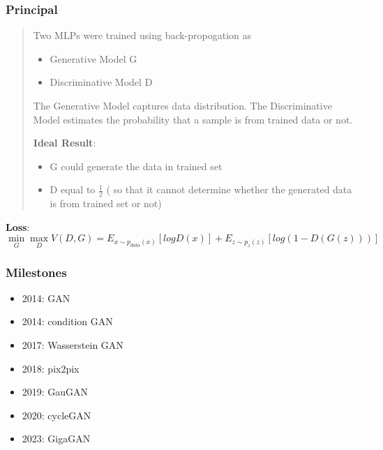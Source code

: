 \begin{frame}
    \frametitle{Principal}
    \begin{quote}
        Two MLPs were trained using back-propogation as
        \begin{itemize}
            \item Generative Model G
            \item Discriminative Model D
        \end{itemize}

        The Generative Model captures data distribution.
        The Discriminative Model estimates the probability that a sample is from trained data or not.

        \textbf{Ideal Result}:
        \begin{itemize}
            \item G could generate the data in trained set
            \item D equal to $\frac{1}{2}$ ( so that it cannot determine whether the generated data is from trained set or not)
        \end{itemize}
    \end{quote}
    \textbf{Loss}:
    $$\min_G\max_DV(D,G) = E_{x\sim p_{data}(x)}[logD(x)] + E_{z\sim p_{z}(z)}[log(1 - D(G(z)))]$$
\end{frame}

\begin{frame}
    \frametitle{Milestones}
    \begin{itemize}
        \item 2014: GAN\cite{goodfellowGenerativeAdversarialNetworks2014}
        \item 2014: condition GAN \cite{mirzaConditionalGenerativeAdversarial2014}
        \item 2017: Wasserstein GAN \cite{arjovskyWassersteinGAN2017}
        \item 2018: pix2pix \cite{isolaImagetoImageTranslationConditional2018}
        \item 2019: GauGAN \cite{parkSemanticImageSynthesis2019}
        \item 2020: cycleGAN \cite{zhuUnpairedImagetoImageTranslation2020}
        \item 2023: GigaGAN \cite{kangScalingGANsTexttoImage2023}
    \end{itemize}
\end{frame}